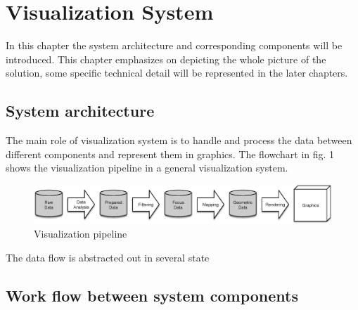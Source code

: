 \chapter{Visualization System}
In this chapter the system architecture and corresponding components will be introduced. This chapter emphasizes on depicting the whole picture of the solution, some specific technical detail will be represented in the later chapters.   

\section{System architecture}

The main role of visualization system is to handle and process the data between different components and represent them in graphics. The flowchart in fig. 1 shows the visualization pipeline in a general visualization system.

\begin{figure}[htb]
  \centering
  \includegraphics[width=.9\textwidth]{Assets/Visualization_Pipeline}
  \caption{Visualization pipeline}
\end{figure}

The data flow is abstracted out in several state 

\section{Work flow between system components}